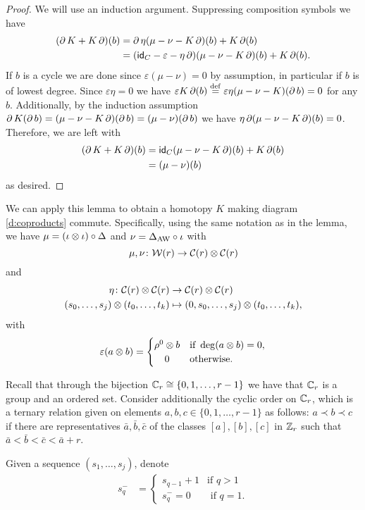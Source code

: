 \begin{proof}
	We will use an induction argument.
	Suppressing composition symbols we have
	\begin{align*}
		(\operatorname{\partial} K+ K\operatorname{\partial})(b)
		&= \operatorname{\partial} \eta(\mu-\nu-K\operatorname{\partial})(b) + K\operatorname{\partial}(b) \\
		&= (\mathsf{id}_C - \varepsilon - \eta\operatorname{\partial})(\mu-\nu - K\operatorname{\partial})(b) + K\operatorname{\partial}(b).
	\end{align*}
	If $b$ is a cycle we are done since $\varepsilon(\mu-\nu) = 0$ by assumption, in particular if $b$ is of lowest degree.
	Since $\varepsilon \eta = 0$ we have $\varepsilon K \operatorname{\partial}(b) \stackrel{\mathrm{def}}{=} \varepsilon \eta(\mu-\nu-K)(\operatorname{\partial} b) = 0$ for any $b$.
	Additionally, by the induction assumption $\operatorname{\partial} K (\operatorname{\partial} b) = (\mu-\nu-K\operatorname{\partial})(\operatorname{\partial} b) = (\mu-\nu)(\operatorname{\partial} b)$ we have $\eta \operatorname{\partial} (\mu-\nu - K\operatorname{\partial})(b) = 0$.
	Therefore, we are left with
	\begin{align*}
		(\operatorname{\partial} K+ K\operatorname{\partial})(b) &=
		\mathsf{id}_C(\mu-\nu-K\operatorname{\partial})(b)+K\operatorname{\partial}(b) \\&=
		(\mu-\nu)(b)
	\end{align*}
	as desired.
\end{proof}

We can apply this lemma to obtain a homotopy $K$ making diagram \eqref{d:coproducts} commute.
Specifically, using the same notation as in the lemma, we have $\mu = (\iota \otimes \iota) \circ \Delta$ and $\nu = \Delta_{\operatorname{AW}} \circ \iota$ with
\[
\mu,\nu \colon \mathcal{W}(r) \to \mathcal{C}(r) \otimes \mathcal{C}(r)
\]
and
\begin{align*}
	\eta \colon \mathcal{C}(r) \otimes \mathcal{C}(r) &\to \mathcal{C}(r) \otimes \mathcal{C}(r) \\
	(s_0,\dots,s_j) \otimes (t_0,\dots,t_k) &\mapsto (0,s_0,\dots,s_j) \otimes (t_0,\dots,t_k),
\end{align*}
with
\[
\varepsilon(a \ot b) =
\begin{cases}
	\rho^0 \ot b & \text{if } \deg(a \ot b) = 0, \\
	\hfil0 & \text{otherwise}.
\end{cases}
\]

Recall that through the bijection $\mathbb{C}_r\cong\{0,1,\ldots,r-1\}$ we have that $\mathbb{C}_r$ is a group and an ordered set.
Consider additionally the cyclic order on $\mathbb{C}_r$, which is a ternary relation given on elements $a,b,c\in \{0,1,\dots,r-1\}$ as follows: $a\prec b\prec c$
if there are representatives $\bar{a},\bar{b},\bar{c}$ of the classes $[a],[b],[c]$ in $\mathbb{Z}_r$ such that $\bar{a}<\bar{b}<\bar{c}<\bar{a}+r$.

\begin{definition}
	Given a sequence $(s_1,\ldots,s_j)$, denote
	\begin{align*}
		s_q^- &= \begin{cases}s_{q-1}+1 & \text{if $q>1$}\\
			s_q^- = 0 & \text{ if $q=1$.}
		\end{cases}
	\end{align*}
\end{definition}

